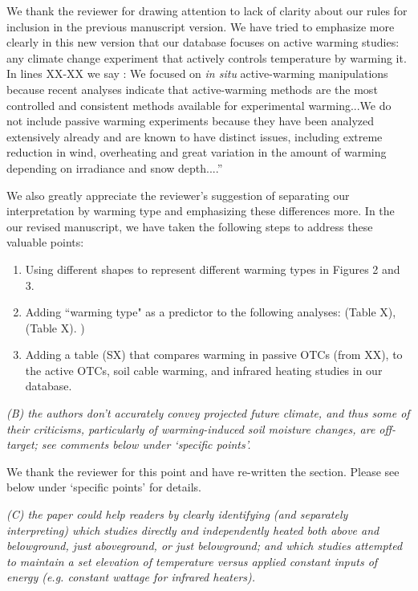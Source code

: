 \documentclass[11pt,a4paper]{letter}
\begin{document}
\par We thank the reviewer for drawing attention to lack of clarity about our rules for inclusion in the previous manuscript version. We have tried to emphasize more clearly in this new version that our database focuses on active warming studies: any climate change experiment that actively controls temperature by warming it. In lines XX-XX we say : We focused on \textit{in situ} active-warming manipulations because recent analyses indicate that active-warming methods are the most controlled and consistent methods available for experimental warming...We do not include passive warming experiments because they have been analyzed extensively already and are known to have distinct issues, including extreme reduction in wind, overheating and great variation in the amount of warming depending on irradiance and snow depth....'' 
\par We also greatly appreciate the reviewer's suggestion of separating our interpretation by warming type and emphasizing these differences more. In the our revised manuscript, we have taken the following steps to address these valuable points:
\begin{enumerate}
\item Using different shapes to represent different warming types in Figures 2 and 3.
\item Adding ``warming type" as a predictor to the following analyses: (Table X), (Table X). )
\item Adding a table (SX) that compares warming in passive OTCs (from XX), to the active OTCs, soil cable warming, and infrared heating studies in our database.
\end{enumerate}


\emph{(B) the authors don't accurately convey projected future climate, and thus some of their criticisms, particularly of warming-induced soil moisture changes, are off-target; see comments below under `specific points'.}

We thank the reviewer for this point and have re-written the section. Please see below under `specific points' for details.

\emph{(C) the paper could help readers by clearly identifying (and separately interpreting) which studies directly and independently heated both above and belowground, just aboveground, or just belowground; and which studies attempted to maintain a set elevation of temperature versus applied constant inputs of energy (e.g. constant wattage for infrared heaters).}
\end{document}
